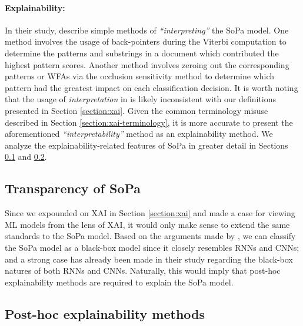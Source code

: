 \paragraph{Explainability:} In their study, \citet[Page 7, Section 7]{schwartz2018sopa} describe simple methods of \textit{``interpreting''} the SoPa model. One method involves the usage of back-pointers during the Viterbi computation to determine the patterns and substrings in a document which contributed the highest pattern scores. Another method involves zeroing out the corresponding patterns or WFAs via the occlusion sensitivity method to determine which pattern had the greatest impact on each classification decision. It is worth noting that the usage of \textit{interpretation} in \citet{schwartz2018sopa} is likely inconsistent with our definitions presented in Section \ref{section:xai}. Given the common terminology misuse described in Section \ref{section:xai-terminology}, it is more accurate to present the aforementioned \textit{``interpretability''} method as an explainability method. We analyze the explainability-related features of SoPa in greater detail in Sections \ref{section:sopa-transparency} and \ref{section:sopa-explainability}. 

\subsection{Transparency of SoPa}

\label{section:sopa-transparency}

Since we expounded on XAI in Section \ref{section:xai} and made a case for viewing ML models from the lens of XAI, it would only make sense to extend the same standards to the SoPa model. Based on the arguments made by \citet{arrieta2020explainable}, we can classify the SoPa model as a black-box model since it closely resembles RNNs and CNNs; and a strong case has already been made in their study regarding the black-box natures of both RNNs and CNNs. Naturally, this would imply that post-hoc explainability methods are required to explain the SoPa model. 

\subsection{Post-hoc explainability methods}

\label{section:sopa-explainability}


